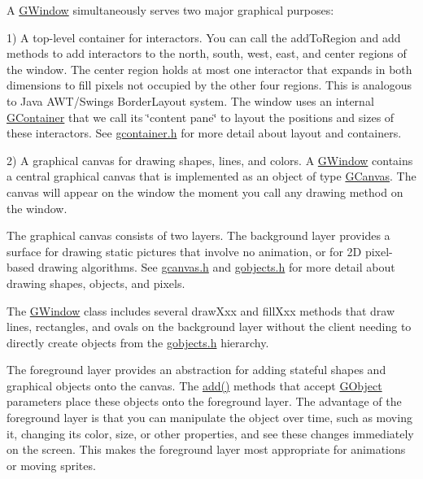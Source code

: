 A \mbox{\hyperlink{classsgl_1_1GWindow}{G\+Window}} simultaneously serves two major graphical purposes\+:

1) A top-\/level container for interactors. You can call the add\+To\+Region and add methods to add interactors to the north, south, west, east, and center regions of the window. The center region holds at most one interactor that expands in both dimensions to fill pixels not occupied by the other four regions. This is analogous to Java A\+W\+T/\+Swing\textquotesingle{}s Border\+Layout system. The window uses an internal \mbox{\hyperlink{classsgl_1_1GContainer}{G\+Container}} that we call its \char`\"{}content pane\char`\"{} to layout the positions and sizes of these interactors. See \mbox{\hyperlink{gcontainer_8h_source}{gcontainer.\+h}} for more detail about layout and containers.

2) A graphical canvas for drawing shapes, lines, and colors. A \mbox{\hyperlink{classsgl_1_1GWindow}{G\+Window}} contains a central graphical canvas that is implemented as an object of type \mbox{\hyperlink{classsgl_1_1GCanvas}{G\+Canvas}}. The canvas will appear on the window the moment you call any drawing method on the window.

The graphical canvas consists of two layers. The background layer provides a surface for drawing static pictures that involve no animation, or for 2D pixel-\/based drawing algorithms. See \mbox{\hyperlink{gcanvas_8h_source}{gcanvas.\+h}} and \mbox{\hyperlink{gobjects_8h_source}{gobjects.\+h}} for more detail about drawing shapes, objects, and pixels.

The \mbox{\hyperlink{classsgl_1_1GWindow}{G\+Window}} class includes several draw\+Xxx and fill\+Xxx methods that draw lines, rectangles, and ovals on the background layer without the client needing to directly create objects from the \mbox{\hyperlink{gobjects_8h_source}{gobjects.\+h}} hierarchy.

The foreground layer provides an abstraction for adding stateful shapes and graphical objects onto the canvas. The \mbox{\hyperlink{classsgl_1_1GWindow_a6f99b7c841256dbdc5acaafbbca4e685}{add()}} methods that accept \mbox{\hyperlink{classsgl_1_1GObject}{G\+Object}} parameters place these objects onto the foreground layer. The advantage of the foreground layer is that you can manipulate the object over time, such as moving it, changing its color, size, or other properties, and see these changes immediately on the screen. This makes the foreground layer most appropriate for animations or moving sprites.

